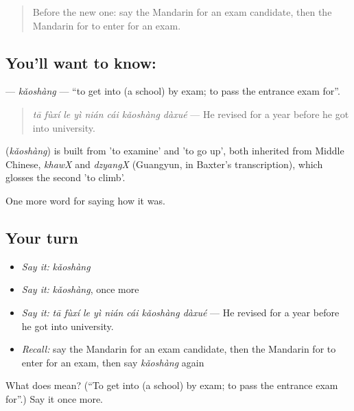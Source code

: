 \label{lesson:ZH-C494-kaoshang}



\begin{quote}
Before the new one: say the Mandarin for an exam candidate, then the Mandarin for to enter for an exam.
\end{quote}

\subsection*{You'll want to know: }
\textbf{} — \emph{kǎoshàng} — \textquotedblleft{}to get into (a school) by exam; to pass the entrance exam for\textquotedblright{}.

\begin{quote}
\emph{tā fùxí le yì nián cái kǎoshàng dàxué} — He revised for a year before he got into university.
\end{quote}

\begin{cousinweb}
\textbf{} (\emph{kǎoshàng}) is built from  'to examine' and  'to go up', both inherited from Middle Chinese, \emph{khawX} and \emph{dzyangX} (Guangyun, in Baxter's transcription), which glosses the second 'to climb'.
\end{cousinweb}

\begin{grammarlens}[title={What you've built}]
One more word for saying how it was.
\end{grammarlens}

\subsection*{Your turn}
\begin{itemize}
\raggedright
  \item \emph{Say it:} \emph{kǎoshàng}
  \item \emph{Say it:} \emph{kǎoshàng}, once more
  \item \emph{Say it:} \emph{tā fùxí le yì nián cái kǎoshàng dàxué} — He revised for a year before he got into university.
  \item \emph{Recall:} say the Mandarin for an exam candidate, then the Mandarin for to enter for an exam, then say \emph{kǎoshàng} again
\end{itemize}

\begin{tcolorbox}[breakable,colback=teal!4,colframe=teal!35!black,title={Before you move on}]
What does  mean? (\textquotedblleft{}To get into (a school) by exam; to pass the entrance exam for\textquotedblright{}.) Say it once more.
\end{tcolorbox}
